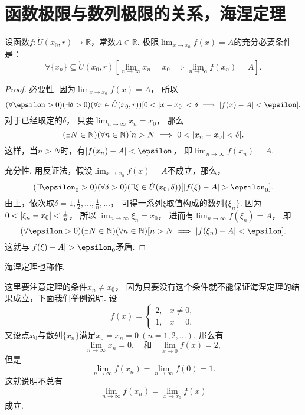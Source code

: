 \section{函数极限与数列极限的关系，海涅定理}
\begin{theorem}[海涅定理]\label{theorem:极限.海涅定理}
\def\Dx{\mathring{U}(x_0,r)}%
设函数\(f\colon \Dx\to\mathbb{R}\)，常数\(A\in\mathbb{R}\).
极限\(\lim_{x \to x_0} f(x) = A\)的充分必要条件是：\[
\forall \{x_n\}\subseteq\Dx \left[
	\lim_{n \to \infty} x_n = x_0
	\implies
	\lim_{n \to \infty} f(x_n) = A
\right].
\]
\begin{proof}
必要性.
因为\(\lim_{x \to x_0} f(x) = A\)，
所以\[
	(\forall \epsilon > 0)
	(\exists \delta > 0)
	(\forall x\in\Dx)
	[
		0 < \abs{x - x_0} < \delta
		\implies
		\abs{f(x) - A} < \epsilon
	].
\]
对于已经取定的\(\delta\)，
只要\(\lim_{n \to \infty}x_n = x_0\)，
那么\[
	(\exists N\in\mathbb{N})
	(\forall n\in\mathbb{N})
	[
		n > N
		\implies
		0 < \abs{x_n - x_0} < \delta
	].
\]
这样，当\(n> N\)时，有\(\abs{f(x_n) - A} < \epsilon\)，
即\(\lim_{n \to \infty} f(x_n) = A\).

充分性.
用反证法，假设\(\lim_{x \to x_0} f(x) = A\)不成立，那么，\[
	(\exists \epsilon_0 > 0)
	(\forall \delta > 0)
	(\exists \xi\in\mathring{U}(x_0,\delta))
	[
		\abs{f(\xi) - A} > \epsilon_0
	].
\]
由上，依次取\(\delta = 1,\frac{1}{2},\dotsc,\frac{1}{n},\dotsc\)，
可得一系列\(\xi\)取值构成的数列\(\{\xi_n\}\).
因为\(0 < \abs{\xi_n - x_0} < \frac{1}{n}\)，
所以\(\lim_{n \to \infty} \xi_n = x_0\)，
进而有\(\lim_{n \to \infty} f(\xi_n) = A\)，
即\[
	(\forall \epsilon > 0)
	(\exists N\in\mathbb{N})
	(\forall n\in\mathbb{N})
	[
		n > N
		\implies
		\abs{f(\xi_n) - A} < \epsilon
	].
\]
这就与\(\abs{f(\xi) - A} > \epsilon_0\)矛盾.
\end{proof}
\end{theorem}
海涅定理也称作.

这里要注意定理的条件\(x_n \neq x_0\)，
因为只要没有这个条件就不能保证海涅定理的结果成立，下面我们举例说明.
设\[
	f(x) = \left\{ \begin{array}{cl}
		2, & x\neq0, \\
		1, & x=0.
	\end{array} \right.
\]
又设点\(x_0\)与数列\(\{x_n\}\)满足\(x_0=x_n=0\ (n=1,2,\dotsc)\).
那么有\[
	\lim_{n\to\infty} x_n = 0,
	\quad\text{和}\quad
	\lim_{x\to0} f(x) = 2,
\]
但是\[
	\lim_{n\to\infty} f(x_n) = \lim_{n\to\infty} f(0) = 1.
\]这就说明不总有\[
	\lim_{n\to\infty} f(x_n)
	= \lim_{x \to x_0} f(x)
\]成立.

